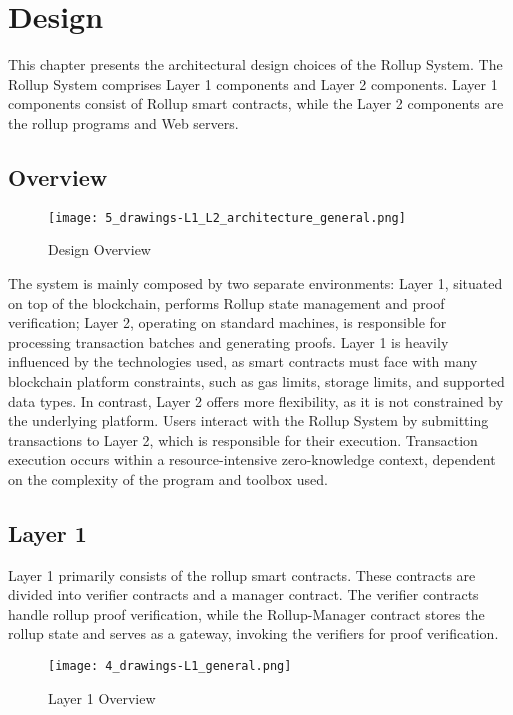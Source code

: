 \chapter{Design\label{cha:chapter5}}
This chapter presents the architectural design choices of the Rollup System. The Rollup System comprises Layer 1 components and Layer 2 components. Layer 1 components consist of Rollup smart contracts, while the Layer 2 components are the rollup programs and Web servers.

\section{Overview}
\begin{figure}[htb]
  \centering
  \texttt{[image: 5\_drawings-L1\_L2\_architecture\_general.png]}
  \caption{Design Overview}
  \label{fig:5_drawings-L1_L2_architecture_general}
\end{figure}

The system is mainly composed by two separate environments: Layer 1, situated on top of the blockchain, performs Rollup state management and proof verification; Layer 2, operating on standard machines, is responsible for processing transaction batches and generating proofs. Layer 1 is heavily influenced by the technologies used, as smart contracts must face with many blockchain platform constraints, such as gas limits, storage limits, and supported data types. In contrast, Layer 2 offers more flexibility, as it is not constrained by the underlying platform. Users interact with the Rollup System by submitting transactions to Layer 2, which is responsible for their execution. Transaction execution occurs within a resource-intensive zero-knowledge context, dependent on the complexity of the program and toolbox used.

\section{Layer 1\label{sec:designLayer1}}
Layer 1 primarily consists of the rollup smart contracts. These contracts are divided into verifier contracts and a manager contract. The verifier contracts handle rollup proof verification, while the Rollup-Manager contract stores the rollup state and serves as a gateway, invoking the verifiers for proof verification.

\begin{figure}[htb]
  \centering
  \texttt{[image: 4\_drawings-L1\_general.png]}
  \caption{Layer 1 Overview}
  \label{fig:Layer1overview}
\end{figure}

